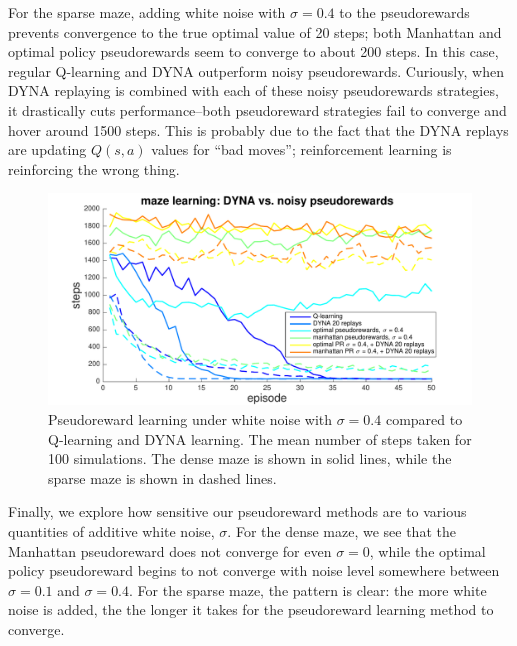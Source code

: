 \documentclass[notitlepage]{article}
\begin{document}
For the sparse maze, adding white noise with $\sigma = 0.4$ to the pseudorewards prevents convergence to the true optimal value of 20 steps; both Manhattan and optimal policy pseudorewards seem to converge to about 200 steps. In this case, regular Q-learning and DYNA outperform noisy pseudorewards. Curiously, when DYNA replaying is combined with each of these noisy pseudorewards strategies, it drastically cuts performance--both pseudoreward strategies fail to converge and hover around 1500 steps. This is probably due to the fact that the DYNA replays are updating $Q(s,a)$ values for ``bad moves''; reinforcement learning is reinforcing the wrong thing.

\begin{figure}[ht]
\includegraphics[width=\textwidth]{modelCompareHighNoise}
\caption{Pseudoreward learning under white noise with $\sigma = 0.4$ compared to Q-learning and DYNA learning. The mean number of steps taken for 100 simulations. The dense maze is shown in solid lines, while the sparse maze is shown in dashed lines.}
\label{fig:model-compare-noise}
\end{figure}

Finally, we explore how sensitive our pseudoreward methods are to various quantities of additive white noise, $\sigma$. For the dense maze, we see that the Manhattan pseudoreward does not converge for even $\sigma = 0$, while the optimal policy pseudoreward begins to not converge with noise level somewhere between $\sigma = 0.1$ and $\sigma = 0.4$. For the sparse maze, the pattern is clear: the more white noise is added, the the longer it takes for the pseudoreward learning method to converge.
\end{document}

